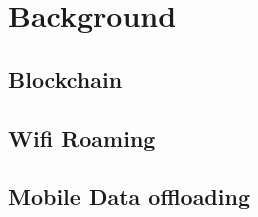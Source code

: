 \chapter{Background}

\section{Blockchain}

\section{Wifi Roaming}

\section{Mobile Data offloading}
